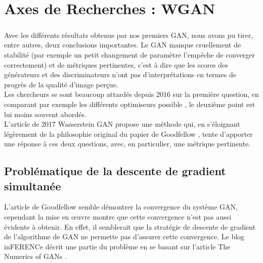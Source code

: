 

\chapter{Axes de Recherches : WGAN}

\paragraph*{} Avec les différents résultats obtenus par nos premiers GAN, nous avons pu tirer, entre autres, deux conclusions importantes. Le GAN manque cruellement de stabilité (par exemple un petit changement de paramètre l'empêche de converger correctement) et de métriques pertinentes, c'est à dire que les scores des générateurs et des discriminateurs n'ont pas d'interprétations en termes de progrès de la qualité d'image perçue.\\
Les chercheurs se sont beaucoup attardés depuis 2016 sur la première question, en comparant par exemple les différents optimiseurs possible \cite{opimiser}, le deuxième point est lui moins souvent abordés. \\
L'article de 2017 Wasserstein GAN \cite{wgan} propose une méthode qui, en s'éloignant légèrement de la philosophie original du papier de Goodfellow \cite{Goodfellow-et-al-2016}, tente d'apporter une réponse à ces deux questions, avec, en particulier, une métrique pertinente.

\section{Problématique de la descente de gradient simultanée}

L'article de Goodfellow semble démontrer la convergence du système GAN, cependant la mise en œuvre montre que cette convergence n'est pas aussi évidente à obtenir. En effet, il semblerait que la stratégie de descente de gradient de l'algorithme de GAN ne permette pas d'assurer cette convergence. Le blog inFERENCe \cite{conservative-field} décrit une partie du problème en se basant sur l'article The Numerics of GANs \cite{numerics-gan}.

